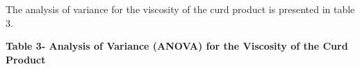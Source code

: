 
The analysis of variance for the viscosity of the curd product is
presented in table 3.

{\bfseries Table 3- Analysis of Variance (ANOVA) for the Viscosity of the
Curd Product}

